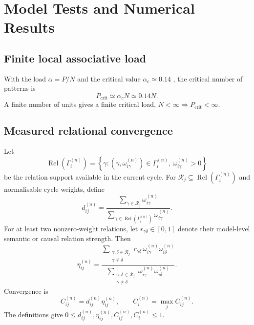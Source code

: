 \section{Model Tests and Numerical Results}
\label{app:model_tests}

\subsection{Finite local associative load}

With the load $\alpha=P/N$ and the critical value $\alpha_c\simeq0.14$
\citep{amit1985}, the critical number of patterns is
\begin{equation}
  P_{\mathrm{crit}}\simeq\alpha_c N\simeq0.14N.
  \label{eq:hopfield_finite_load}
\end{equation}
\noindent A finite number of units gives a finite critical load,
$N<\infty\Rightarrow P_{\mathrm{crit}}<\infty$.

\subsection{Measured relational convergence}

Let
\begin{equation}
  \operatorname{Rel}\!\left(\Gamma_i^{(n)}\right)=
  \left\{\gamma:(\gamma,\omega_{i\gamma}^{(n)})\in\Gamma_i^{(n)},\ 
  \omega_{i\gamma}^{(n)}>0\right\}
  \label{eq:available_relation_support}
\end{equation}
be the relation support available in the current cycle. For
$\mathcal R_j\subseteq\operatorname{Rel}(\Gamma_i^{(n)})$ and normalisable cycle
weights, define
\begin{equation}
  d_{ij}^{(n)}=
  \frac{\displaystyle\sum_{\gamma\in\mathcal R_j}\omega_{i\gamma}^{(n)}}
       {\displaystyle\sum_{\gamma\in\operatorname{Rel}(\Gamma_i^{(n)})}
         \omega_{i\gamma}^{(n)}}.
  \label{eq:relational_dominance}
\end{equation}
For at least two nonzero-weight relations, let $r_{\gamma\delta}\in[0,1]$ denote
their model-level semantic or causal relation strength. Then
\begin{equation}
  \eta_{ij}^{(n)}=
  \frac{\displaystyle
    \sum_{\substack{\gamma,\delta\in\mathcal R_j\\\gamma\neq\delta}}
      r_{\gamma\delta}\,
      \omega_{i\gamma}^{(n)}\omega_{i\delta}^{(n)}}
       {\displaystyle
    \sum_{\substack{\gamma,\delta\in\mathcal R_j\\\gamma\neq\delta}}
      \omega_{i\gamma}^{(n)}\omega_{i\delta}^{(n)}}.
  \label{eq:relational_coherence}
\end{equation}
Convergence is
\begin{equation}
  C_{ij}^{(n)}=d_{ij}^{(n)}\eta_{ij}^{(n)},
  \qquad
  C_i^{(n)}=\max_j C_{ij}^{(n)}.
  \label{eq:weighted_convergence}
\end{equation}
The definitions give $0\leq d_{ij}^{(n)},\eta_{ij}^{(n)},C_{ij}^{(n)},C_i^{(n)}\leq1$.

